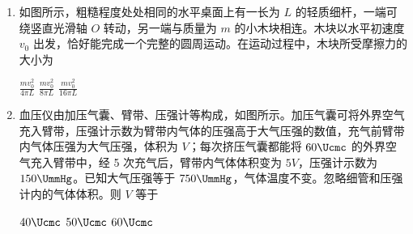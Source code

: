 \documentclass[\gkver]{gaokaozhenti}
\begin{document}
\begin{enumerate}
{	CD．由 AB 分析，小瓶上升时，小瓶内气体内能增加，气体对外做功，根据热力学第一定律 $\Delta U = W + Q$，由于气体对外做功，因此吸收的热量大于增加的内能，CD 错误。

	故选 B。
}

\item
如图所示，粗糙程度处处相同的水平桌面上有一长为 $L$ 的轻质细杆，一端可绕竖直光滑轴 $O$ 转动，另一端与质量为 $m$ 的小木块相连。木块以水平初速度 $v_{0}$ 出发，恰好能完成一个完整的圆周运动。在运动过程中，木块所受摩擦力的大小为 


{$\frac{mv_{0}^{2}}{4\pi L}$}
{$\frac{mv_{0}^{2}}{8\pi L}$}
{$\frac{mv_{0}^{2}}{16\pi L}$}


\item
血压仪由加压气囊、臂带、压强计等构成，如图所示。加压气囊可将外界空气充入臂带，压强计示数为臂带内气体的压强高于大气压强的数值，充气前臂带内气体压强为大气压强，体积为 $V$；每次挤压气囊都能将 $60 \Ucmc$ 的外界空气充入臂带中，经 5 次充气后，臂带内气体体积变为 $5V$，压强计示数为 $150 \UmmHg$。已知大气压强等于 $750 \UmmHg$，气体温度不变。忽略细管和压强计内的气体体积。则 $V$ 等于 


\fourchoices[answer=D]
{$30 \Ucmc$}
{$40 \Ucmc$}
{$50 \Ucmc$}
{$60 \Ucmc$}

\end{enumerate}
\end{document}
